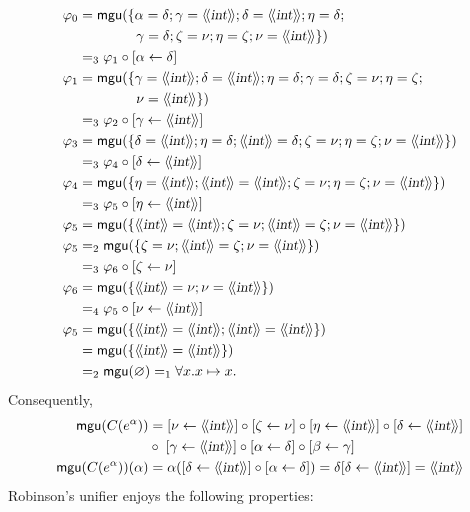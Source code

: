 \begin{align*}
  \varphi_0 &= \mgu(\{\alpha = \delta; \gamma = \src{\type{int}};
  \delta = \src{\type{int}}; \eta = \delta;\\
            &\phantom{=\mgu(\{)} \gamma = \delta; \zeta =
  \nu; \eta = \zeta; \nu = \src{\type{int}}\})\\
            &=_3 \varphi_1 \circ [\alpha \leftarrow \delta]\\
  \varphi_1 &= \mgu(\{\gamma = \src{\type{int}};
  \delta = \src{\type{int}}; \eta = \delta; \gamma = \delta; \zeta =
  \nu; \eta = \zeta;\\
            &\phantom{=\mgu(\{)} \nu = \src{\type{int}}\})\\
            &=_3 \varphi_2 \circ [\gamma \leftarrow \src{\type{int}}]\\
  \varphi_3 &= \mgu(\{\delta = \src{\type{int}}; \eta = \delta;
  \src{\type{int}} = \delta; \zeta = \nu; \eta = \zeta; \nu =
  \src{\type{int}}\})\\
            &=_3 \varphi_4 \circ [\delta \leftarrow \src{\type{int}}]\\
  \varphi_4 &= \mgu(\{\eta = \src{\type{int}}; \src{\type{int}} =
  \src{\type{int}}; \zeta = \nu; \eta = \zeta; \nu =
  \src{\type{int}}\})\\
            &=_3 \varphi_5 \circ [\eta \leftarrow \src{\type{int}}]\\
  \varphi_5 &= \mgu(\{\src{\type{int}} = \src{\type{int}}; \zeta =
  \nu; \src{\type{int}} = \zeta; \nu = \src{\type{int}}\})\\
  \varphi_5 &=_2 \mgu(\{\zeta = \nu; \src{\type{int}} = \zeta; \nu =
  \src{\type{int}}\})\\
            &=_3 \varphi_6 \circ [\zeta \leftarrow \nu]\\
  \varphi_6 &= \mgu(\{\src{\type{int}} = \nu; \nu =
  \src{\type{int}}\})\\
            &=_4 \varphi_5 \circ [\nu \leftarrow \src{\type{int}}]\\
  \varphi_5 &= \mgu(\{\src{\type{int}} = \src{\type{int}};
  \src{\type{int}} = \src{\type{int}}\})\\
            &= \mgu(\{\src{\type{int}} = \src{\type{int}}\})\\
            &=_2 \mgu(\varnothing) =_1 \forall x.x \mapsto x.
\end{align*}
Consequently,
\begin{align*}
\mgu(C(\te{e}{\alpha})) &= [\nu \leftarrow \src{\type{int}}] \circ
[\zeta \leftarrow \nu] \circ [\eta \leftarrow \src{\type{int}}] \circ
[\delta \leftarrow \src{\type{int}}]\\ 
& \circ \; [\gamma \leftarrow \src{\type{int}}] \circ [\alpha
  \leftarrow \delta] \circ [\beta \leftarrow \gamma]\\
\mgu(C(\te{e}{\alpha})) (\alpha) &= \alpha ([\delta \leftarrow
  \src{\type{int}}] \circ [\alpha \leftarrow \delta]) = \delta [\delta
  \leftarrow \src{\type{int}}] = \src{\type{int}}
\end{align*}
Robinson's unifier enjoys the following properties:

